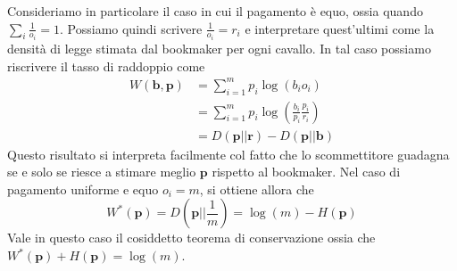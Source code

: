\documentclass[a4paper,11pt]{book}
\theoremstyle{plain}
\theoremstyle{definition}
\theoremstyle{remark}
\begin{document}
Consideriamo in particolare il caso in cui il pagamento è equo, ossia quando $\sum_{i}\frac{1}{o_i} = 1$. Possiamo quindi scrivere $\frac{1}{o_i}=r_i$ e interpretare quest'ultimi come la densità di legge stimata dal bookmaker per ogni cavallo. In tal caso possiamo riscrivere il tasso di raddoppio come
\begin{equation*}
\begin{split}
	W(\bm{b},\bm{p}) & = \sum_{i = 1}^{m}{p_i \log(b_io_i)}\\
	& = \sum_{i=1}^{m}{p_i\log\left(\frac{b_i}{p_i}\frac{p_i}{r_i}\right)}\\
	& = D(\bm{p}||\bm{r}) - D(\bm{p}||\bm{b})
\end{split}
\end{equation*}
Questo risultato si interpreta facilmente col fatto che lo scommettitore guadagna se e solo se riesce a stimare meglio $\bm{p}$ rispetto al bookmaker.\newline
Nel caso di pagamento uniforme e equo $o_i = m$, si ottiene allora che 
\begin{equation*}
	W^*(\bm{p})= D\left(\bm{p}\left\vert\right\vert\frac{1}{m}\right) = \log (m) -H(\bm{p})
\end{equation*}
Vale in questo caso il cosiddetto teorema di conservazione ossia che $W^*(\bm{p})+H(\bm{p})=\log(m)$.
\end{document}
